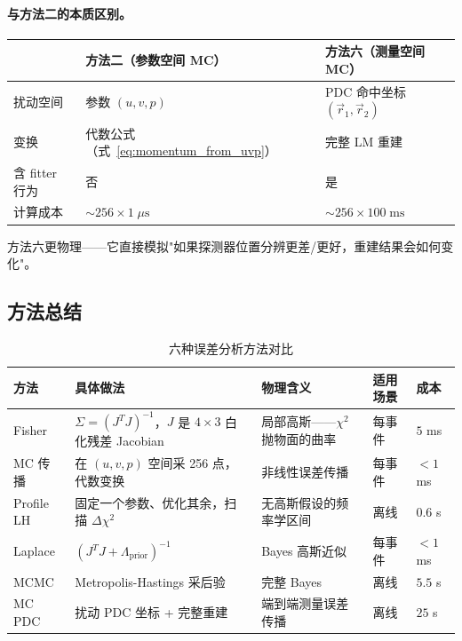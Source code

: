 \documentclass[a4paper, 11pt]{article}
\begin{document}
\paragraph{与方法二的本质区别。}
\begin{table}[H]
\centering
\begin{tabular}{lll}
\toprule
 & 方法二（参数空间 MC） & 方法六（测量空间 MC） \\
\midrule
扰动空间 & 参数 $(u, v, p)$ & PDC 命中坐标 $(\vec{r}_1, \vec{r}_2)$ \\
变换 & 代数公式（式~\eqref{eq:momentum_from_uvp}） & 完整 LM 重建 \\
含 fitter 行为 & 否 & 是 \\
计算成本 & $\sim 256 \times 1\;\mu\mathrm{s}$ & $\sim 256 \times 100\;\mathrm{ms}$ \\
\bottomrule
\end{tabular}
\end{table}

方法六更物理——它直接模拟"如果探测器位置分辨更差/更好，重建结果会如何变化"。

\subsection{方法总结}

\begin{table}[H]
\centering
\caption{六种误差分析方法对比}
\label{tab:error_methods}
\begin{tabular}{p{2.4cm}p{3.8cm}p{3.5cm}p{2.0cm}p{1.8cm}}
\toprule
方法 & 具体做法 & 物理含义 & 适用场景 & 成本 \\
\midrule
Fisher & $\Sigma = (J^TJ)^{-1}$，$J$ 是 $4{\times}3$ 白化残差 Jacobian & 局部高斯——$\chi^2$ 抛物面的曲率 & 每事件 & $5$ ms \\
MC 传播 & 在 $(u,v,p)$ 空间采 256 点，代数变换 & 非线性误差传播 & 每事件 & $<\!1$ ms \\
Profile LH & 固定一个参数、优化其余，扫描 $\Delta\chi^2$ & 无高斯假设的频率学区间 & 离线 & $0.6$ s \\
Laplace & $(J^TJ + \Lambda_\mathrm{prior})^{-1}$ & Bayes 高斯近似 & 每事件 & $<\!1$ ms \\
MCMC & Metropolis-Hastings 采后验 & 完整 Bayes & 离线 & $5.5$ s \\
MC PDC & 扰动 PDC 坐标 + 完整重建 & 端到端测量误差传播 & 离线 & $25$ s \\
\bottomrule
\end{tabular}
\end{table}
\end{document}
